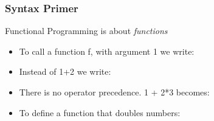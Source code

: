\documentclass{beamer}
\begin{document}






\begin{frame}
  \frametitle{Syntax Primer}
  Functional Programming is about \emph{functions}
  \begin{itemize}
  \item<1-> To call a function f, with argument 1 we write: \syntaxOne
  \item<2-> Instead of 1+2 we write: \syntaxTwo
  \item<3-> There is no operator precedence. 1 + 2*3 becomes: \syntaxThree
  \item<4-> To define a function that doubles numbers: \syntaxFour
    
  \end{itemize}
\end{frame}
\end{document}
